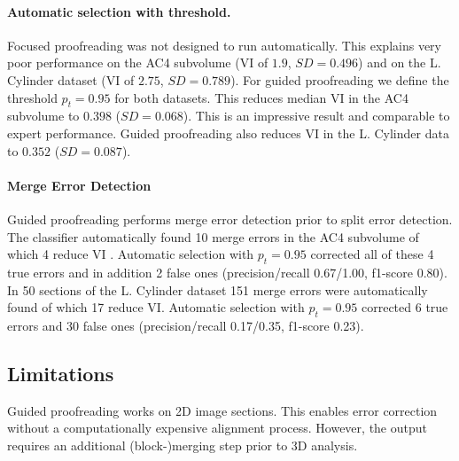 \paragraph{Automatic selection with threshold.} Focused proofreading was not designed to run automatically. This explains very poor performance on the AC4 subvolume (VI of $1.9$, $SD=0.496$) and on the L. Cylinder dataset (VI of $2.75$, $SD=0.789$). For guided proofreading we define the threshold $p_t=0.95$ for both datasets. This reduces median VI in the AC4 subvolume to $0.398$ ($SD=0.068$). This is an impressive result and comparable to expert performance. Guided proofreading also reduces VI in the L. Cylinder data to $0.352$ ($SD=0.087$).

\paragraph{Merge Error Detection} Guided proofreading performs merge error detection prior to split error detection. The classifier automatically found 10 merge errors in the AC4 subvolume of which 4 reduce VI . Automatic selection with $p_t=0.95$ corrected all of these 4 true errors and in addition 2 false ones (precision/recall 0.67/1.00, f1-score 0.80). In 50 sections of the L. Cylinder dataset 151 merge errors were automatically found of which 17 reduce VI. Automatic selection with $p_t=0.95$ corrected 6 true errors and 30 false ones (precision/recall 0.17/0.35, f1-score 0.23). 

\subsection{Limitations}
Guided proofreading works on 2D image sections. This enables error correction without a computationally expensive alignment process. However, the output requires an additional (block-)merging step prior to 3D  analysis.
